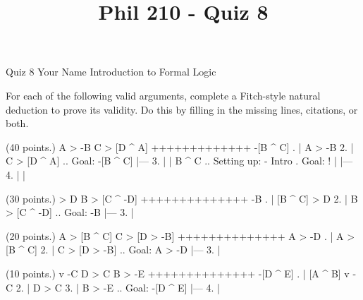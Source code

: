 
\title{Phil 210 - Quiz 8}

\heading
Quiz 8
Your Name
Introduction to Formal Logic
\endheading

For each of the following valid arguments, complete a Fitch-style natural deduction to prove its validity. Do this by filling in the missing lines, citations, or both.

\problems
{} (40 points.)
\argument
 A > -B
 C > [D ^ A]
+++++++++++++
 -[B ^ C]
\endargument
        \answer
        . | A > -B
         2. | C > [D ^ A]  ..  Goal: -[B ^ C]
            |---
         3. |   | B ^ C    ..  Setting up: - Intro  .  Goal: ! 
            |   |---
         4. |   | 
        \endfitchproof
        \endanswer

 (30 points.)
\argument
 [B ^ C] > D
 B > [C ^ -D]
++++++++++++++
 -B
\endargument
        \answer
        . | [B ^ C] > D
         2. | B > [C ^ -D]  ..  Goal: -B
            |---
         3. |
        \endfitchproof
        \endanswer

 (20 points.)
\argument
 A > [B ^ C]
 C > [D > -B]
++++++++++++++
 A > -D
\endargument
        \answer
        . | A > [B ^ C]
         2. | C > [D > -B]  ..  Goal: A > -D
            |---
         3. | 
        \endfitchproof
        \endanswer

 (10 points.)
\argument
 [A ^ B] v -C
 D > C
 B > -E
++++++++++++++
 -[D ^ E]
\endargument
        \answer
        . | [A ^ B] v -C
         2. | D > C
         3. | B > -E        ..  Goal: -[D ^ E]
            |---
         4. | 
        \endfitchproof
        \endanswer

\endproblems
\bye
